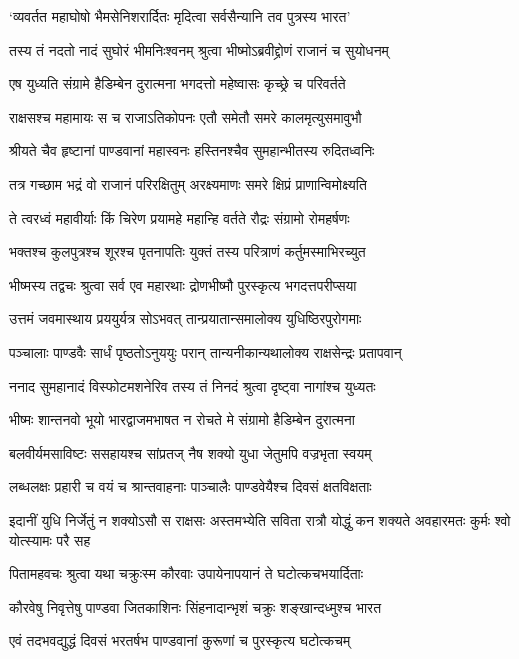 \twolineshloka
{`व्यवर्तत महाघोषो भैमसेनिशरार्दितः}
{मृदित्वा सर्वसैन्यानि तव पुत्रस्य भारत'}


\twolineshloka
{तस्य तं नदतो नादं सुघोरं भीमनिःश्वनम्}
{श्रुत्वा भीष्मोऽब्रवीद्द्रोणं राजानं च सुयोधनम्}


\twolineshloka
{एष युध्यति संग्रामे हैडिम्बेन दुरात्मना}
{भगदत्तो महेष्वासः कृच्छ्रे च परिवर्तते}


\twolineshloka
{राक्षसश्च महामायः स च राजाऽतिकोपनः}
{एतौ समेतौ समरे कालमृत्युसमावुभौ}


\twolineshloka
{श्रीयते चैव हृष्टानां पाण्डवानां महास्वनः}
{हस्तिनश्चैव सुमहान्भीतस्य रुदितध्वनिः}


\twolineshloka
{तत्र गच्छाम भद्रं वो राजानं परिरक्षितुम्}
{अरक्ष्यमाणः समरे क्षिप्रं प्राणान्विमोक्ष्यति}


\twolineshloka
{ते त्वरध्वं महावीर्याः किं चिरेण प्रयामहे}
{महान्हि वर्तते रौद्रः संग्रामो रोमहर्षणः}


\twolineshloka
{भक्तश्च कुलपुत्रश्च शूरश्च पृतनापतिः}
{युक्तं तस्य परित्राणं कर्तुमस्माभिरच्युत}


\twolineshloka
{भीष्मस्य तद्वचः श्रुत्वा सर्व एव महारथाः}
{द्रोणभीष्मौ पुरस्कृत्य भगदत्तपरीप्सया}


\twolineshloka
{उत्तमं जवमास्थाय प्रययुर्यत्र सोऽभवत्}
{तान्प्रयातान्समालोक्य युधिष्ठिरपुरोगमाः}


\twolineshloka
{पञ्चालाः पाण्डवैः सार्धं पृष्ठतोऽनुययुः परान्}
{तान्यनीकान्यथालोक्य राक्षसेन्द्रः प्रतापवान्}


\twolineshloka
{ननाद सुमहानादं विस्फोटमशनेरिव}
{तस्य तं निनदं श्रुत्वा दृष्ट्वा नागांश्च युध्यतः}


\twolineshloka
{भीष्मः शान्तनवो भूयो भारद्वाजमभाषत}
{न रोचते मे संग्रामो हैडिम्बेन दुरात्मना}


\twolineshloka
{बलवीर्यमसाविष्टः ससहायश्च सांप्रतज्}
{नैष शक्यो युधा जेतुमपि वज्रभृता स्वयम्}


\twolineshloka
{लब्धलक्षः प्रहारी च वयं च श्रान्तवाहनाः}
{पाञ्चालैः पाण्डवेयैश्च दिवसं क्षतविक्षताः}


\threelineshloka
{इदानीं युधि निर्जेतुं न शक्योऽसौ स राक्षसः}
{अस्तमभ्येति सविता रात्रौ योद्धुं कन शक्यते}
{अवहारमतः कुर्मः श्वो योत्स्यामः परै सह}


\twolineshloka
{पितामहवचः श्रुत्वा यथा चक्रुःस्म कौरवाः}
{उपायेनापयानं ते घटोत्कचभयार्दिताः}


\twolineshloka
{कौरवेषु निवृत्तेषु पाण्डवा जितकाशिनः}
{सिंहनादान्भृशं चक्रुः शङ्खान्दध्मुश्च भारत}


\twolineshloka
{एवं तदभवद्युद्धं दिवसं भरतर्षभ}
{पाण्डवानां कुरूणां च पुरस्कृत्य घटोत्कचम्}


